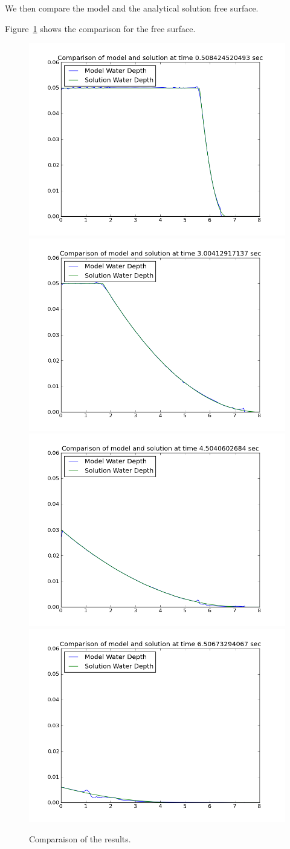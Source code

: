 We then compare the model and the analytical solution free surface.

Figure~\ref{fig:swash:res} shows the comparison for the free surface.

\begin{figure}[H]
\centering
\includegraphics[width=.5\textwidth]{img/res_t0_5.png}
\includegraphics[width=.5\textwidth]{img/res_t3_0.png}
\includegraphics[width=.5\textwidth]{img/res_t4_5.png}
\includegraphics[width=.5\textwidth]{img/res_t6_5.png}
\caption{Comparaison of the results.}
\label{fig:swash:res}
\end{figure}

